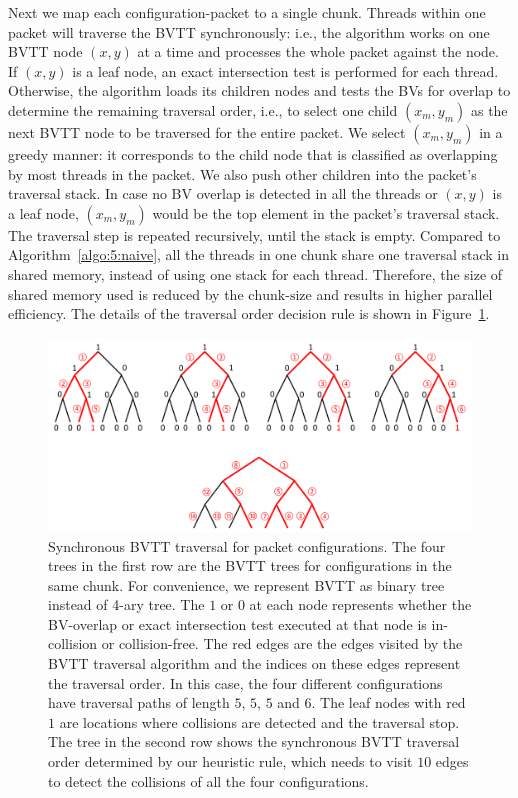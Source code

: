 Next we map each configuration-packet to a single chunk. Threads within one packet will traverse the BVTT synchronously: i.e., the algorithm works on one BVTT node $(x, y)$ at a time and processes the whole packet against the node. If $(x,y)$ is a leaf node, an exact intersection test is performed for each thread. Otherwise, the algorithm loads its children nodes and tests the BVs for overlap to determine the remaining traversal order, i.e., to select one child $(x_m, y_m)$ as the next BVTT node to be traversed for the entire packet. We select $(x_m, y_m)$ in a greedy manner: it corresponds to the child node that is classified as overlapping by most threads in the packet. We also push other children into the packet's traversal stack. In case no BV overlap is detected in all the
threads or $(x,y)$ is a leaf node, $(x_m, y_m)$ would be the top element in the packet's traversal stack.  The traversal
step is repeated recursively, until the stack is empty. Compared to Algorithm~\ref{algo:5:naive}, all the threads in one chunk share one
traversal stack in shared memory, instead of using one stack for each thread. Therefore, the size of shared memory used
is reduced by the $\text{chunk-size}$ and results in higher parallel efficiency. The details of the traversal order decision rule is shown in Figure~\ref{fig:5:packettraverse}.

\begin{figure}[htb]
  \centering
  \includegraphics[width=\linewidth]{figs/5/packettraverse.pdf}
  \caption[Synchronous BVTT traversal for packet configurations]{Synchronous BVTT traversal for packet configurations. The four trees in the first row are the BVTT trees for configurations in the same chunk. For convenience, we represent BVTT as binary tree instead of 4-ary tree. The $1$ or $0$ at each node represents whether the BV-overlap or exact intersection test executed at that node is in-collision or collision-free. The red edges are the edges visited by the BVTT traversal algorithm and the indices on these edges
  represent the traversal order. In this case, the four different configurations have traversal paths of length $5$, $5$, $5$ and $6$. The leaf nodes with red $1$ are locations where collisions are detected and  the traversal stop.
  The tree in the second row shows the synchronous BVTT traversal order determined by our heuristic rule, which needs to visit $10$ edges to detect the collisions of all the four configurations.}
  \label{fig:5:packettraverse}
\end{figure}

